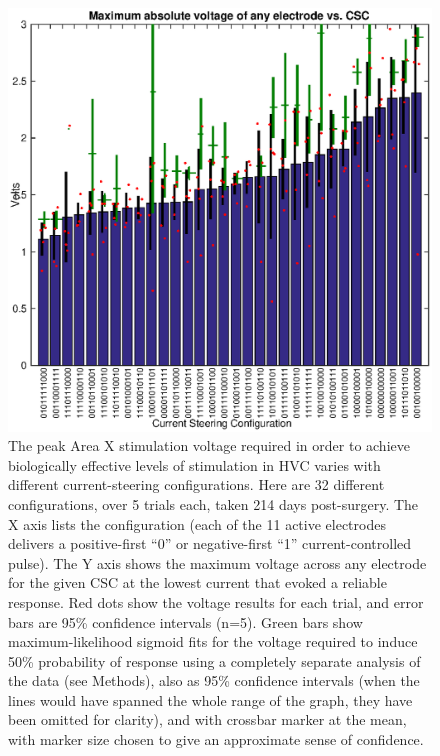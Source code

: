 \documentclass[10pt,letterpaper]{article}
\begin{document}
\begin{figure}
  \includegraphics[width=\textwidth]{VoltageVsCSC}
  \caption{The peak Area X stimulation voltage required in order to
    achieve biologically effective levels of stimulation in HVC varies
    with different current-steering configurations.  Here are 32
    different configurations, over 5 trials each, taken 214 days
    post-surgery.  The X axis lists the configuration (each of the 11
    active electrodes delivers a positive-first ``0'' or
    negative-first ``1'' current-controlled pulse).  The Y axis shows
    the maximum voltage across any electrode for the given CSC at the
    lowest current that evoked a reliable response.  Red dots show the
    voltage results for each trial, and error bars are 95\% confidence
    intervals (n=5).  Green bars show maximum-likelihood sigmoid fits
    for the voltage required to induce 50\% probability of response
    using a completely separate analysis of the data (see Methods),
    also as 95\% confidence intervals (when the lines would have
    spanned the whole range of the graph, they have been omitted for
    clarity), and with crossbar marker at the mean, with marker size
    chosen to give an approximate sense of confidence.}
  \label{fig:VoltageVsCSC}
\end{figure}
\end{document}
